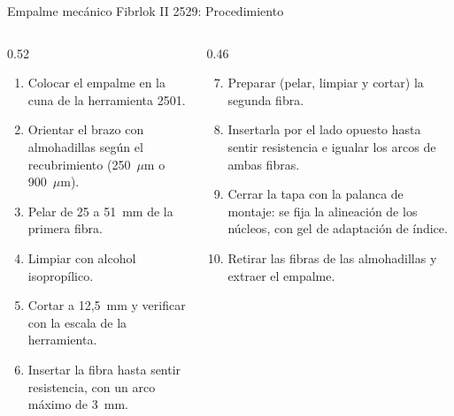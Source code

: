 \documentclass[aspectratio=169,10pt]{beamer}
\begin{document}
\begin{frame}{Empalme mecánico Fibrlok II 2529: Procedimiento}
  \footnotesize
  \begin{columns}[T]
    \begin{column}{0.52\textwidth}
      \begin{enumerate}
        \item Colocar el empalme en la cuna de la herramienta 2501.
        \item Orientar el brazo con almohadillas según el recubrimiento (250~$\mu$m o 900~$\mu$m).
        \item Pelar de 25 a 51~mm de la primera fibra.
        \item Limpiar con alcohol isopropílico.
        \item Cortar a {12,5~mm} y verificar con la escala de la herramienta.
        \item Insertar la fibra hasta sentir resistencia, con un arco máximo de 3~mm.
      \end{enumerate}
    \end{column}
    \begin{column}{0.46\textwidth}
      \begin{enumerate}
        \setcounter{enumi}{6}
        \item Preparar (pelar, limpiar y cortar) la segunda fibra.
        \item Insertarla por el lado opuesto hasta sentir resistencia e {igualar los arcos} de ambas fibras.
        \item Cerrar la tapa con la palanca de montaje: se fija la alineación de los núcleos, con gel de adaptación de índice.
        \item Retirar las fibras de las almohadillas y extraer el empalme.
      \end{enumerate}
    \end{column}
  \end{columns}
\end{frame}
\end{document}
